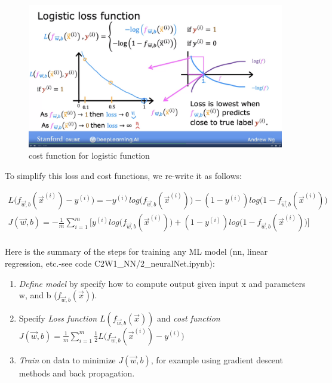 \documentclass[12pt]{report}
\begin{document}
\begin{figure}[htbp]
  \begin{center}
    \includegraphics[trim =0cm 6.0cm 0cm 0.0cm, clip, scale=0.15]{pics/logistic2.png}
    \caption{cost function for logistic function}
  \end{center}
\end{figure}

To simplify this loss and cost functions, we re-write it as follows:

\begin{multline}
L\big(f_{\overrightarrow{w},b} (\overrightarrow{x}^{(i)})   - y^{(i)} \big) = - y^{(i)} log\big( f_{\overrightarrow{w},b} (\overrightarrow{x}^{(i)}) \big) - (1-y^{(i)}) log\big(1-f_{\overrightarrow{w},b} (\overrightarrow{x}^{(i)}) \big) \\
J(\overrightarrow{w},b)   = -\frac{1}{m} \sum_{i=1}^{m} \big[ y^{(i)} log\big( f_{\overrightarrow{w},b} (\overrightarrow{x}^{(i)}) \big) + (1-y^{(i)}) log\big(1-f_{\overrightarrow{w},b} (\overrightarrow{x}^{(i)}) \big)  \big] \\
\end{multline}


Here is the summary of the steps for training any ML model (nn, linear regression, etc.-see code C2W1\_NN/2\_neuralNet.ipynb):
\begin{enumerate}
  \item \textit{Define model} by specify how to compute output given input x and parameters w, and b ($f_{\overrightarrow{w},b} (\overrightarrow{x})$).
  \item Specify \textit{Loss function} $L (f_{\overrightarrow{w},b} (\overrightarrow{x}) )  $ and \textit{cost function} $J(\overrightarrow{w},b) = \frac{1}{m} \sum_{i=1}^{m} \frac{1}{2}  L\big(f_{\overrightarrow{w},b} (\overrightarrow{x}^{(i)}) - y^{(i)} \big)$
  \item \textit{Train} on data to minimize $J(\overrightarrow{w},b)$, for example using gradient descent methods and back propagation.
\end{enumerate}
\end{document}
